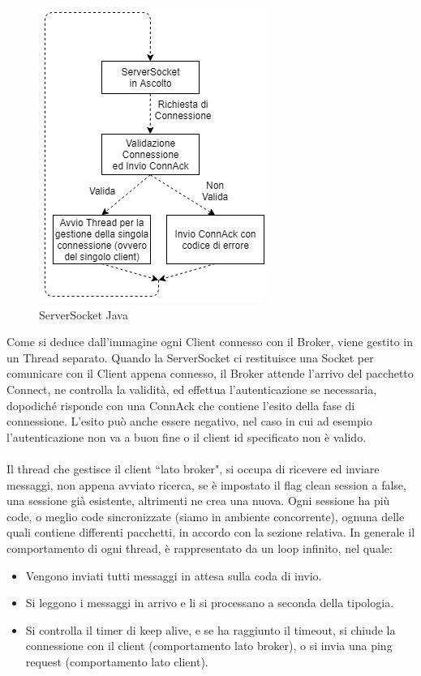\documentclass{article}
\begin{document}
\begin{figure}[htbp]
	\centerline{\includegraphics[scale=0.6]{immagini/serversocket.png}}
	\caption{ServerSocket Java}
\end{figure}
Come si deduce dall'immagine ogni Client connesso con il Broker, viene gestito in un Thread separato. Quando la ServerSocket ci restituisce una Socket per comunicare con il Client appena connesso, il Broker attende l'arrivo del pacchetto Connect, ne controlla la validità, ed effettua l'autenticazione se necessaria, dopodiché risponde con una ConnAck che contiene l'esito della fase di connessione. L'esito può anche essere negativo, nel caso in cui ad esempio l'autenticazione non va a buon fine o il client id specificato non è valido.\\\\
Il thread che gestisce il client ``lato broker", si occupa di ricevere ed inviare messaggi, non appena avviato ricerca, se è impostato il flag clean session a false, una sessione già esistente, altrimenti ne crea una nuova. Ogni sessione ha più code, o meglio code sincronizzate (siamo in ambiente concorrente), ognuna delle quali contiene differenti pacchetti, in accordo con la sezione relativa. In generale il comportamento di ogni thread, è rappresentato da un loop infinito, nel quale:
\begin{itemize}
	\item Vengono inviati tutti messaggi in attesa sulla coda di invio.
	\item Si leggono i messaggi in arrivo e li si processano a seconda della tipologia.
	\item Si controlla il timer di keep alive, e se ha raggiunto il timeout, si chiude la connessione con il client (comportamento lato broker), o si invia una ping request (comportamento lato client).
\end{itemize}
\end{document}
